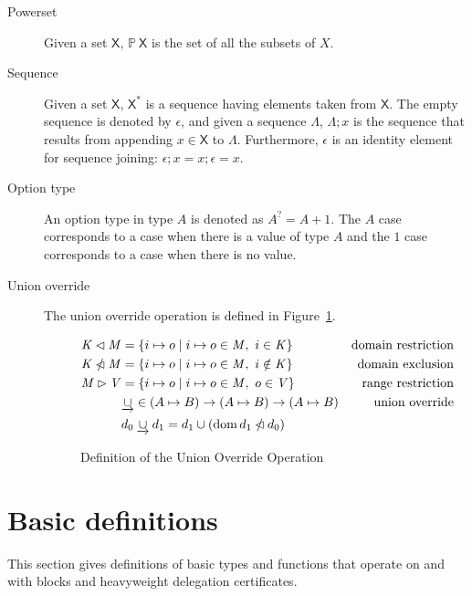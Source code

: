\documentclass[11pt,a4paper]{article}
\DeclareMathOperator{\dom}{dom}
\newcommand{\powerset}[1]{\mathbb{P}~#1}
\newcommand{\restrictdom}{\lhd}
\newcommand{\subtractdom}{\mathbin{\slashed{\restrictdom}}}
\newcommand{\restrictrange}{\rhd}
\newcommand{\unionoverride}{\mathbin{\underrightarrow\cup}}
\newcommand{\var}[1]{\mathit{#1}}
\newcommand{\type}[1]{\mathsf{#1}}
\newcommand{\seqof}[1]{#1^{*}}
\begin{document}
\begin{description}
\item[Powerset] Given a set $\type{X}$, $\powerset{\type{X}}$ is the set of all
  the subsets of $X$.
\item[Sequence] Given a set $\type{X}$, $\seqof{\type{X}}$ is a sequence
  having elements taken from $\type{X}$.
  The empty sequence is denoted by $\epsilon$, and given a sequence $\Lambda$,
  $\Lambda; x$ is the sequence that results from appending
  $x \in \type{X}$ to $\Lambda$.
  Furthermore, $\epsilon$ is an identity element for sequence joining:
  $\epsilon; x = x; \epsilon = x$.
\item[Option type] An option type in type $A$ is denoted as $A^? = A + 1$. The
  $A$ case corresponds to a case when there is a value of type $A$ and the $1$
  case corresponds to a case when there is no value.
\item[Union override] The union override operation is defined in
  Figure~\ref{fig:unionoverride}.
  \begin{figure}
    \begin{align*}
      \var{K} \restrictdom \var{M}
      & = \{ i \mapsto o \mid i \mapsto o \in \var{M}, ~ i \in \var{K} \}
      & \text{domain restriction}
      \\
      \var{K} \subtractdom \var{M}
      & = \{ i \mapsto o \mid i \mapsto o \in \var{M}, ~ i \notin \var{K} \}
      & \text{domain exclusion}
      \\
      \var{M} \restrictrange \var{V}
      & = \{ i \mapsto o \mid i \mapsto o \in \var{M}, ~ o \in \var{V} \}
      & \text{range restriction}
      \\
      & \unionoverride \in (A \mapsto B) \to (A \mapsto B) \to (A \mapsto B)
      & \text{union override}\\
      & d_0 \unionoverride d_1 = d_1 \cup (\dom d_1 \subtractdom d_0)
    \end{align*}
    \caption{Definition of the Union Override Operation}
    \label{fig:unionoverride}
  \end{figure}
\end{description}

\section{Basic definitions}
\label{sec:basic-definitions}

This section gives definitions of basic types and functions that operate on
and with blocks and heavyweight delegation certificates.
\end{document}
